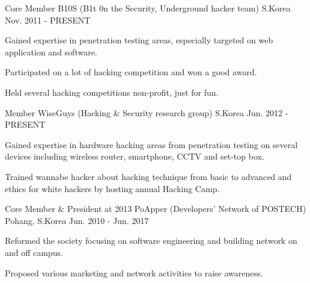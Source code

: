 
\begin{cventries}

  \cventry
  {Core Member} %
  {B10S (B1t 0n the Security, Underground hacker team)} %
  {S.Korea} %
  {Nov. 2011 - PRESENT} %
  {
    \begin{cvitems} %
    \item {Gained expertise in penetration testing areas, especially targeted on web application and software.}
    \item {Participated on a lot of hacking competition and won a good award.}
    \item {Held several hacking competitions non-profit, just for fun.}
    \end{cvitems}
  }

  \cventry
  {Member} %
  {WiseGuys (Hacking \& Security research group)} %
  {S.Korea} %
  {Jun. 2012 - PRESENT} %
  {
    \begin{cvitems} %
    \item {Gained expertise in hardware hacking areas from penetration testing on several devices including
      wireless router, smartphone, CCTV and set-top box.}
    \item {Trained wannabe hacker about hacking technique from basic to advanced and ethics for white hackers
      by hosting annual Hacking Camp.}
    \end{cvitems}
  }

  \cventry
  {Core Member \& President at 2013} %
  {PoApper (Developers' Network of POSTECH)} %
  {Pohang, S.Korea} %
  {Jun. 2010 - Jun. 2017} %
  {
    \begin{cvitems} %
    \item {Reformed the society focusing on software engineering and building network on and off campus.}
    \item {Proposed various marketing and network activities to raise awareness.}
    \end{cvitems}
  }


\end{cventries}
